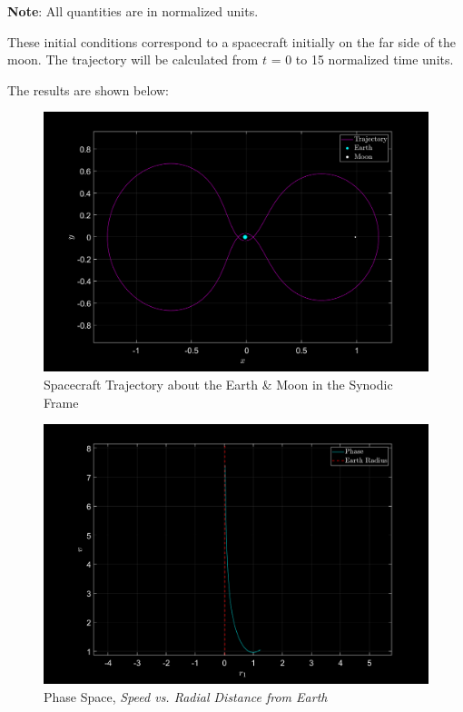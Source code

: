 \textbf{Note}: All quantities are in normalized units.

\vspace{\baselineskip}

These initial conditions correspond to a spacecraft initially on the far side of the moon. The trajectory will be calculated from $t$ = 0 to 15 normalized time units.

\vspace{\baselineskip}

The results are shown below:

\begin{figure}[h]
    \centering
    \includegraphics[width=\textwidth]{fig/trajectory1.png}
    \caption{Spacecraft Trajectory about the Earth \& Moon in the Synodic Frame}
    \label{fig1}
\end{figure}

\pagebreak

\begin{figure}[!h]
    \centering
    \includegraphics[width=\textwidth]{fig/phase1.png}
    \caption{Phase Space, \textit{Speed vs. Radial Distance from Earth}}
    \label{fig2}
\end{figure}



